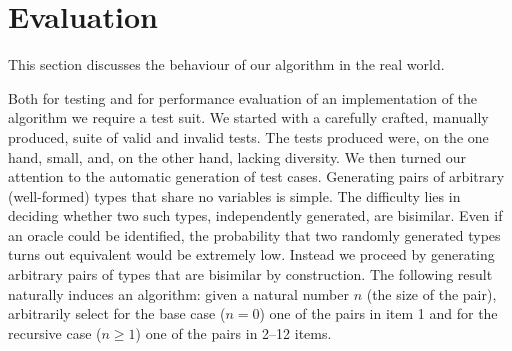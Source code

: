 \section{Evaluation}
\label{sec:evaluation}

This section discusses the behaviour of our algorithm in the real
world.

Both for testing and for performance evaluation of an implementation
of the algorithm we require a test suit. We started with a carefully
crafted, manually produced, suite of valid and invalid tests. The
tests produced were, on the one hand, small, and, on the other hand,
lacking diversity. We then turned our attention to the automatic
generation of test cases. Generating pairs of arbitrary (well-formed)
types that share no variables is simple. The difficulty lies in
deciding whether two such types, independently generated, are
bisimilar. Even if an oracle could be identified, the probability that
two randomly generated types turns out equivalent would be extremely
low. Instead we proceed by generating arbitrary pairs of types that
are bisimilar by construction. The following result naturally induces
an algorithm: given a natural number $n$ (the size of the pair),
arbitrarily select for the base case ($n=0$) one of the pairs in item
1 and for the recursive case ($n\ge1$) one of the pairs in 2--12
items.


